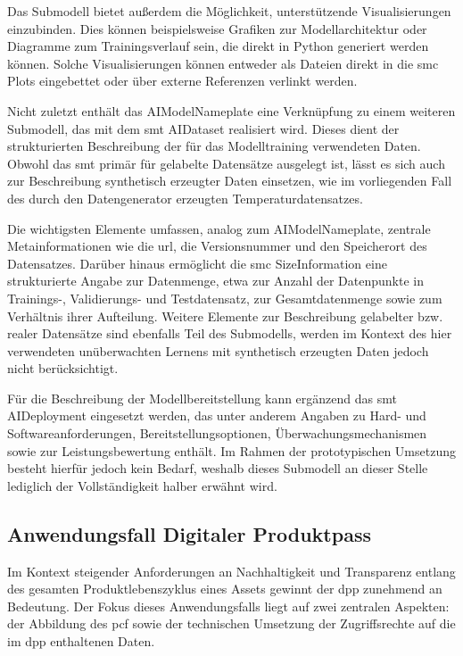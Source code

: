 Das Submodell bietet außerdem die Möglichkeit, unterstützende Visualisierungen einzubinden. 
Dies können beispielsweise Grafiken zur Modellarchitektur oder Diagramme zum Trainingsverlauf sein, die direkt in Python generiert werden können. 
Solche Visualisierungen können entweder als Dateien direkt in die \acs{smc} Plots eingebettet oder über externe Referenzen verlinkt werden.

Nicht zuletzt enthält das AIModelNameplate eine Verknüpfung zu einem weiteren Submodell, das mit dem \acs{smt} AIDataset \cite{SpezifikationAIDataset} realisiert wird.
Dieses dient der strukturierten Beschreibung der für das Modelltraining verwendeten Daten.
Obwohl das \acs{smt} primär für gelabelte Datensätze ausgelegt ist, lässt es sich auch zur Beschreibung synthetisch erzeugter Daten einsetzen, wie im vorliegenden Fall des durch den Datengenerator erzeugten Temperaturdatensatzes.

Die wichtigsten Elemente umfassen, analog zum AIModelNameplate, zentrale Metainformationen wie die \acs{url}, die Versionsnummer und den Speicherort des Datensatzes.
Darüber hinaus ermöglicht die \acs{smc} SizeInformation eine strukturierte Angabe zur Datenmenge, etwa zur Anzahl der Datenpunkte in Trainings-, Validierungs- und Testdatensatz, zur Gesamtdatenmenge sowie zum Verhältnis ihrer Aufteilung.
Weitere Elemente zur Beschreibung gelabelter bzw. realer Datensätze sind ebenfalls Teil des Submodells, werden im Kontext des hier verwendeten unüberwachten Lernens mit synthetisch erzeugten Daten jedoch nicht berücksichtigt.

Für die Beschreibung der Modellbereitstellung kann ergänzend das \acs{smt} AIDeployment \cite{SpezifikationAIDeployement} eingesetzt werden, das unter anderem Angaben zu Hard- und Softwareanforderungen, Bereitstellungsoptionen, Überwachungsmechanismen sowie zur Leistungsbewertung enthält.
Im Rahmen der prototypischen Umsetzung besteht hierfür jedoch kein Bedarf, weshalb dieses Submodell an dieser Stelle lediglich der Vollständigkeit halber erwähnt wird.

\subsection{Anwendungsfall Digitaler Produktpass}
Im Kontext steigender Anforderungen an Nachhaltigkeit und Transparenz entlang des gesamten Produktlebenszyklus eines Assets gewinnt der \acs{dpp} zunehmend an Bedeutung. 
Der Fokus dieses Anwendungsfalls liegt auf zwei zentralen Aspekten: der Abbildung des \acs{pcf} sowie der technischen Umsetzung der Zugriffsrechte auf die im \acs{dpp} enthaltenen Daten.

